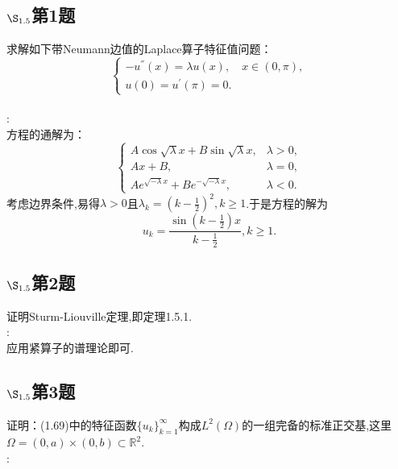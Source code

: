 \documentclass[12pt, a4paper]{ctexbook}
\begin{document}
    
    \subsection{$\S_{1.5}$第1题}
    \kaishu{}求解如下带Neumann边值的Laplace算子特征值问题：
    \begin{equation*}
    \begin{cases}
    -u^{''}(x) = \lambda u(x), \quad x \in (0,\pi),\\
    u(0) = u^{'}(\pi) = 0.
    \end{cases}
    \end{equation*}\\
    
    \songti{}:\\
    
    方程的通解为：
    \begin{equation*}
    \begin{cases}
    A\cos\sqrt{\lambda}x + B \sin \sqrt{\lambda}x, &\lambda >0,\\
    Ax+B , &\lambda = 0,\\
    Ae^{\sqrt{-\lambda}x}+ Be^{-\sqrt{-\lambda}x}, &\lambda <0.
    \end{cases}
    \end{equation*}
    考虑边界条件,易得$\lambda>0$且$\lambda_k = (k-\frac12)^2,k\ge1$.于是方程的解为
    \begin{equation*}
    u_k = \frac{\sin(k-\frac12)x}{k-\frac12},k\ge 1 .
    \end{equation*}
    
    \subsection{$\S_{1.5}$第2题}
    \kaishu{}证明Sturm-Liouville定理,即定理1.5.1.\\
    
    \songti{}:\\
    
    应用紧算子的谱理论即可.
    
    \subsection{$\S_{1.5}$第3题}
    \kaishu{}证明：(1.69)中的特征函数$\{u_k\}_{k=1}^{\infty}$构成$L^2(\Omega)$的一组完备的标准正交基,这里$\Omega=(0,a)\times (0,b) \subset \mathbb{R}^2$.\\
    
    \songti{}:\\
    
\end{document}
